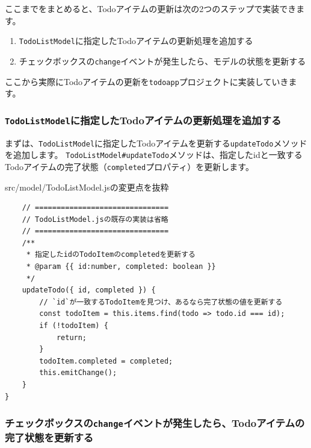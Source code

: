 ここまでをまとめると、Todoアイテムの更新は次の2つのステップで実装できます。

\begin{enumerate}
\def\labelenumi{\arabic{enumi}.}
\item
  \texttt{TodoListModel}に指定したTodoアイテムの更新処理を追加する
\item
  チェックボックスの\texttt{change}イベントが発生したら、モデルの状態を更新する
\end{enumerate}

ここから実際にTodoアイテムの更新を\texttt{todoapp}プロジェクトに実装していきます。

\hypertarget{TodoListModel-updateTodo}{%
\subsubsection{\texorpdfstring{\texttt{TodoListModel}に指定したTodoアイテムの更新処理を追加する}{TodoListModelに指定したTodoアイテムの更新処理を追加する}}\label{TodoListModel-updateTodo}}

まずは、\texttt{TodoListModel}に指定したTodoアイテムを更新する\texttt{updateTodo}メソッドを追加します。
\texttt{TodoListModel\#updateTodo}メソッドは、指定したidと一致するTodoアイテムの完了状態（\texttt{completed}プロパティ）を更新します。

\begin{listtitle}
src/model/TodoListModel.jsの変更点を抜粋
\end{listtitle}
\begin{lstlisting}
    // ===============================
    // TodoListModel.jsの既存の実装は省略
    // ===============================
    /**
     * 指定したidのTodoItemのcompletedを更新する
     * @param {{ id:number, completed: boolean }}
     */
    updateTodo({ id, completed }) {
        // `id`が一致するTodoItemを見つけ、あるなら完了状態の値を更新する
        const todoItem = this.items.find(todo => todo.id === id);
        if (!todoItem) {
            return;
        }
        todoItem.completed = completed;
        this.emitChange();
    }
}
\end{lstlisting}
\listend

\hypertarget{onChange-update-model}{%
\subsubsection{\texorpdfstring{チェックボックスの\texttt{change}イベントが発生したら、Todoアイテムの完了状態を更新する}{チェックボックスのchangeイベントが発生したら、Todoアイテムの完了状態を更新する}}\label{onChange-update-model}}

